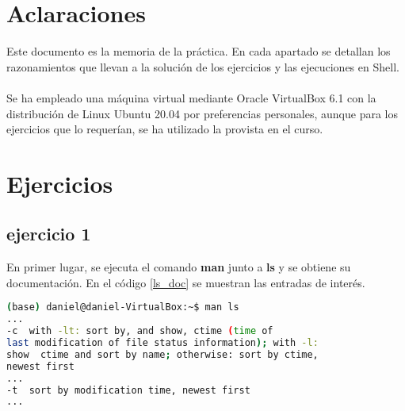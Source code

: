 \section{Aclaraciones}
Este documento es la memoria de la práctica. En cada apartado se detallan los razonamientos que llevan a la solución de los ejercicios y las ejecuciones en Shell.\\\\
Se ha empleado una máquina virtual mediante Oracle VirtualBox 6.1 con la distribución de Linux Ubuntu 20.04 por preferencias personales, aunque para los ejercicios que lo requerían, se ha utilizado la provista en el curso. 
\section{Ejercicios}
\subsection*{ejercicio 1}
%
En primer lugar, se ejecuta el comando \textbf{man} junto a \textbf{ls} y se obtiene su documentación. En el código \ref{ls_doc} se muestran las entradas de interés.
\begin{lstlisting}[language=bash,caption={Documentación del comando ls}, label={ls_doc}]
(base) daniel@daniel-VirtualBox:~$ man ls
...
-c	with -lt: sort by, and show, ctime (time of 
last modification of file status information); with -l: 
show  ctime and sort by name; otherwise: sort by ctime,
newest first
...
-t	sort by modification time, newest first
...
\end{lstlisting}

